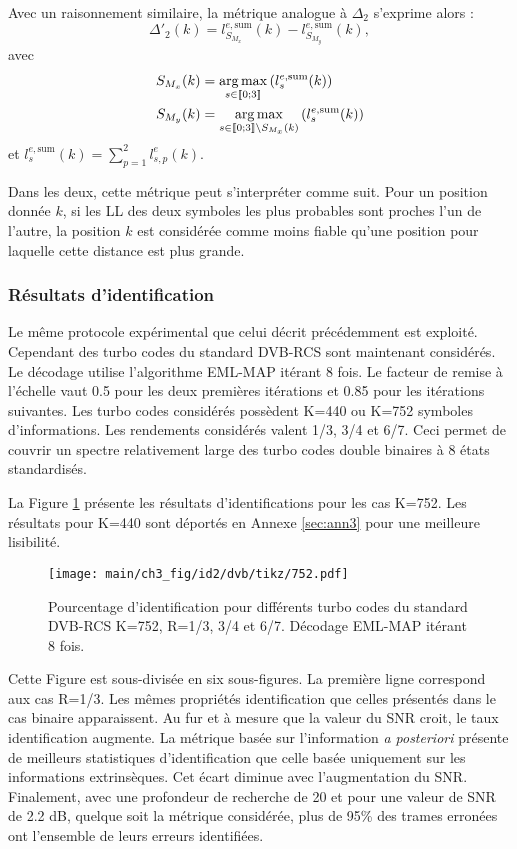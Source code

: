 Avec un raisonnement similaire, la métrique analogue à $\Delta_2$ s'exprime alors : 
\begin{equation}
	\Delta'_2(k) = l^{e,\text{sum}}_{S_{M_x}}(k)-l^{e,\text{sum}}_{S_{M_y}}(k),
\end{equation}
avec
\begin{align*}
S_{M_x}(k) &= \operatorname*{arg\,max}\limits_{s\in\llbracket0;3\rrbracket}\left(l^{e,\text{sum}}_s(k)\right) \\
S_{M_y}(k) &= \operatorname*{arg\,max}\limits_{s\in\llbracket0;3\rrbracket\setminus{S_{M_x}(k)}}\left(l^{e,\text{sum}}_s(k)\right)
\end{align*}
et $l^{e,\text{sum}}_s(k) = \sum\limits_{p=1}^2l^e_{s,p}(k)$.

Dans les deux, cette métrique peut s'interpréter comme suit. Pour un position donnée $k$, si les LL des deux symboles les 
plus probables sont proches l'un de l'autre, la position $k$ est considérée comme moins fiable qu'une position pour
laquelle cette distance est plus grande.

\subsubsection{Résultats d'identification}
Le même protocole expérimental que celui décrit précédemment est exploité. Cependant des turbo codes du standard DVB-RCS
sont maintenant considérés. Le décodage utilise l'algorithme EML-MAP itérant 8 fois. Le facteur de remise à l'échelle 
vaut 0.5 pour les deux premières itérations et 0.85 pour les itérations suivantes. Les turbo codes considérés possèdent K=440
ou K=752 symboles d'informations. Les rendements considérés valent 1/3, 3/4 et 6/7. Ceci permet de couvrir un spectre 
relativement large des turbo codes double binaires à 8 états standardisés. 

La Figure \ref{fig:dvb752} présente les résultats d'identifications pour les cas K=752. Les résultats pour K=440 sont 
déportés en Annexe \ref{sec:ann3} pour une meilleure lisibilité.
\begin{figure}[!h]
	\centering
	\hspace*{-1cm}
	\texttt{[image: main/ch3\_fig/id2/dvb/tikz/752.pdf]}
	\vspace*{-1em}
	\caption{Pourcentage d'identification pour différents turbo codes du standard DVB-RCS K=752, R=1/3, 3/4 et 6/7.
	Décodage EML-MAP itérant 8 fois. \label{fig:dvb752}}
\end{figure}
Cette Figure est sous-divisée en six sous-figures. La première ligne correspond aux cas R=1/3. Les mêmes propriétés 
identification que celles présentés dans le cas binaire apparaissent. Au fur et à mesure que la valeur du SNR croit, le 
taux identification augmente. La métrique basée sur l'information \textit{a posteriori} présente de meilleurs statistiques
d'identification que celle basée uniquement sur les informations extrinsèques. Cet écart diminue avec l'augmentation du SNR.
Finalement, avec une profondeur de recherche de 20 et pour une valeur de SNR de 2.2 dB, quelque soit la métrique considérée, 
plus de 95\% des trames erronées ont l'ensemble de leurs erreurs identifiées.

